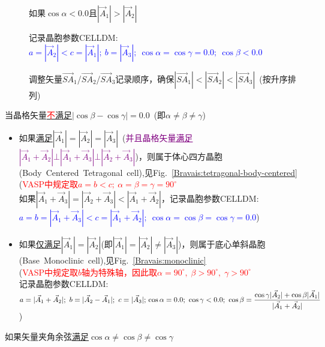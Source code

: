 \documentclass{article}      %
\begin{document}
\begin{description}
\begin{description}
\begin{description}
					\begin{description}
						\item[] 如果$\cos\alpha<0.0$且$|\vec A_1|>|\vec A_2|$
						\item[]	记录晶胞参数\textrm{CELLDM}:~\textcolor{blue}{$a=|\vec A_2|<c=|\vec A_1|;~b=|\vec A_3|;~\cos\alpha=\cos\gamma=0.0;~\cos\beta<0.0$}
						\item[] 调整矢量$\vec{SA}_1$/$\vec{SA}_2$/$\vec{SA}_3$记录顺序，确保$|\vec{SA}_1|<|\vec{SA}_2|<|\vec{SA}_3|$~(按升序排列)
					\end{description}
			\end{description}
			\item[] 当晶格矢量\underline{\textcolor{red}{不}满足}$|\cos\beta-\cos\gamma|=0.0$~(即$\alpha\neq\beta\neq\gamma$)
				\begin{itemize}
					\item 如果\underline{满足}$|\vec A_1|=|\vec A_2|=|\vec A_3|$~(\textcolor{purple}{并且晶格矢量\underline{满足}$|\vec A_1+\vec A_2|\bot|\vec A_1+\vec A_3|\bot|\vec A_2+\vec A_3|$})，则属于体心四方晶胞(\textrm{Body~Centered~Tetragonal~cell}),见\textrm{Fig.~}\ref{Bravais:tetragonal-body-centered}\\
						(\textcolor{red}{\textrm{VASP}中规定取$a=b<c;~\alpha=\beta=\gamma=90^{\circ}$}\\
						如果$|\vec A_1+\vec A_3|=|\vec A_2+\vec A_3|<|\vec A_1+\vec A_2|$，记录晶胞参数\textrm{CELLDM}:\\
						\textcolor{blue}{$a=b=|\vec A_1+\vec A_3|<c=|\vec A_1+\vec A_2|;~\cos\alpha=\cos\beta=\cos\gamma=0.0$})
					\item 如果\underline{仅满足}$|\vec A_1|=|\vec A_2|$(即$|\vec A_1|=|\vec A_2|\neq|\vec A_3|$)，则属于底心单斜晶胞(\textrm{Base~Monoclinic~cell}),见\textrm{Fig.~}\ref{Bravais:monoclinic}\\
						(\textcolor{red}{\textrm{VASP}中规定取$b$轴为特殊轴，因此取$\alpha=90^{\circ},\;\beta>90^{\circ},\;\gamma>90^{\circ}$}\\
						记录晶胞参数\textrm{CELLDM}:~\textcolor{blue}{$a=|\vec A_1+\vec A_2|;~b=|\vec A_2-\vec A_1|;~c=|\vec A_3|;\\\cos\alpha=0.0;~\cos\gamma<0.0;~\cos\beta=\dfrac{\cos\gamma|\vec A_2|+\cos\beta|\vec A_1|}{|\vec A_1+\vec A_2|}$})
				\end{itemize}
		\end{description}
	\item[] 如果矢量夹角余弦\underline{满足}$\cos\alpha\neq\cos\beta\neq\cos\gamma$
		\begin{itemize}

\end{itemize}
\end{description}
\end{document}

